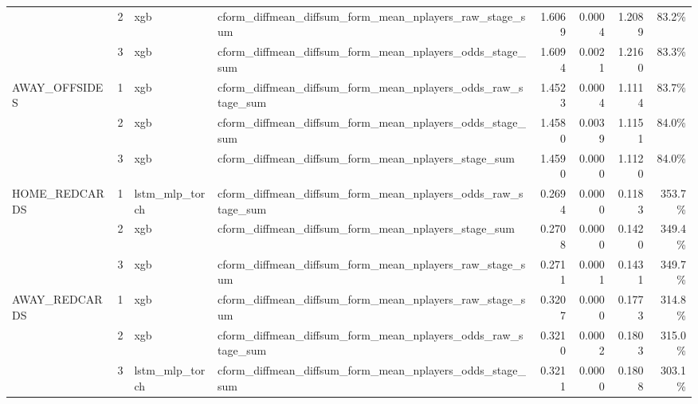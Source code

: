 \begin{table}[ht]
\begin{tabular}{llllrrrr}
 & 2 & xgb & cform_diffmean_diffsum_form_mean_nplayers_raw_stage_sum & 1.6069 & 0.0004 & 1.2089 & 83.2\% \\
 & 3 & xgb & cform_diffmean_diffsum_form_mean_nplayers_odds_stage_sum & 1.6094 & 0.0021 & 1.2160 & 83.3\% \\
\midrule
AWAY\_OFFSIDES & 1 & xgb & cform_diffmean_diffsum_form_mean_nplayers_odds_raw_stage_sum & 1.4523 & 0.0004 & 1.1114 & 83.7\% \\
 & 2 & xgb & cform_diffmean_diffsum_form_mean_nplayers_odds_stage_sum & 1.4580 & 0.0039 & 1.1151 & 84.0\% \\
 & 3 & xgb & cform_diffmean_diffsum_form_mean_nplayers_stage_sum & 1.4590 & 0.0000 & 1.1120 & 84.0\% \\
\midrule
HOME\_REDCARDS & 1 & lstm\_mlp\_torch & cform_diffmean_diffsum_form_mean_nplayers_odds_raw_stage_sum & 0.2694 & 0.0000 & 0.1183 & 353.7\% \\
 & 2 & xgb & cform_diffmean_diffsum_form_mean_nplayers_stage_sum & 0.2708 & 0.0000 & 0.1420 & 349.4\% \\
 & 3 & xgb & cform_diffmean_diffsum_form_mean_nplayers_raw_stage_sum & 0.2711 & 0.0001 & 0.1431 & 349.7\% \\
\midrule
AWAY\_REDCARDS & 1 & xgb & cform_diffmean_diffsum_form_mean_nplayers_raw_stage_sum & 0.3207 & 0.0000 & 0.1773 & 314.8\% \\
 & 2 & xgb & cform_diffmean_diffsum_form_mean_nplayers_odds_raw_stage_sum & 0.3210 & 0.0002 & 0.1803 & 315.0\% \\
 & 3 & lstm\_mlp\_torch & cform_diffmean_diffsum_form_mean_nplayers_odds_stage_sum & 0.3211 & 0.0000 & 0.1808 & 303.1\% \\
\bottomrule
\end{tabular}
\end{table}
